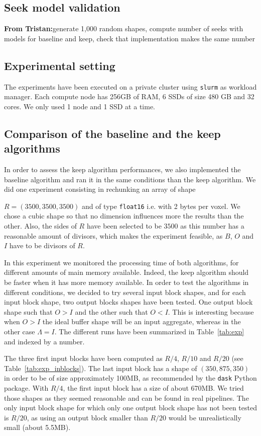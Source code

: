 \documentclass[sigconf, nonacm]{acmart}
\newcommand{\tristan}[1]{\color{orange}\textbf{From Tristan:}#1\color{black}}
\begin{document}
\subsection{Seek model validation}

\tristan{generate 1,000 random shapes, compute number of seeks with models for baseline and keep, 
check that implementation makes the same number}

\subsection{Experimental setting}
The experiments have been executed on a private
cluster using \texttt{slurm} as workload manager. Each compute node has 256GB of
RAM, 6 SSDs of size 480 GB and 32 cores. We only used 1 node and 1 SSD at a
time.

\subsection{Comparison of the baseline and the keep algorithms}
In order to assess the keep algorithm performances, we also implemented the
baseline algorithm and ran it in the same conditions than the keep algorithm.
We did one experiment consisting in rechunking an array of shape

$R=(3500,3500,3500)$ and of type \texttt{float16} i.e. with 2 bytes per voxel.
We chose a cubic shape so that no dimension influences more the results than
the other.
Also, the sides of $R$ have been selected to be $3500$ as this number has a
reasonable amount of divisors, which makes the experiment feasible, as
$B$, $O$ and $I$ have to be divisors of $R$.

In this experiment we monitored the processing time of both algorithms, for
different amounts of main memory available.
Indeed, the keep algorithm should be faster when it has more memory available.
In order to test the algorithms in different conditions, we decided to try
several input block shapes, and for each input block shape, two output blocks
shapes have been tested. One output block shape such that $O>I$ and the other
such that $O<I$. This is interesting because when $O>I$ the ideal buffer shape
will be an input aggregate, whereas in the other case $\Lambda=I$.
The different runs have been summarized in Table~\ref{tab:exp} and indexed by
a number.

The three first input blocks have been computed as $R/4$, $R/10$ and $R/20$
(see Table~\ref{tab:exp_inblocks}).
The last input block has a shape of $(350,875,350)$ in order to be of size
approximately 100MB, as recommended by the \texttt{dask} Python package.
With $R/4$, the first input block has a size of about 670MB.
We tried those shapes as they seemed reasonable and can be found in real pipelines.
The only input block shape for which only one output block shape has not been tested
is $R/20$, as using an output block smaller than $R/20$ would be unrealistically
small (about 5.5MB).
\end{document}

